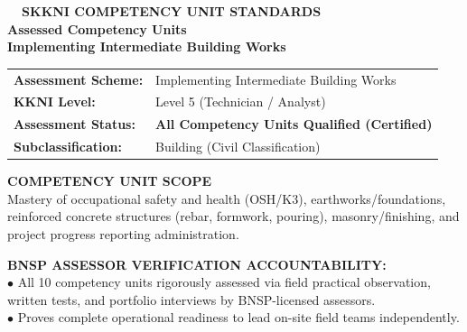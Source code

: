 \documentclass[10pt,a4paper,landscape]{article}
\begin{document}
\noindent
\begin{minipage}[t]{0.30\linewidth}
  \vspace{0pt}
  \begin{tcolorbox}[sharp corners, boxrule=0.8pt, colframe=pborder, colback=white, left=3mm, right=3mm, top=2.5mm, bottom=2.5mm, height=100mm]
    \colorbox{pred}{\fontsize{7pt}{8pt}\selectfont\bfseries\color{white}\ \ SKKNI COMPETENCY UNIT STANDARDS\ \ }\\[1.5mm]
    {\fontsize{9.5pt}{11.5pt}\selectfont\bfseries\color{pnavy}Assessed Competency Units}\\[0.5mm]
    {\fontsize{7pt}{8.5pt}\selectfont\bfseries\color{pred}Implementing Intermediate Building Works}\\[2mm]

    \begin{tcolorbox}[sharp corners, boxrule=0.5pt, colframe=pborder, colback=pbglight, left=2mm, right=2mm, top=1.5mm, bottom=1.5mm]
      \begin{tabularx}{\linewidth}{@{}p{22mm} X@{}}
        {\fontsize{6.8pt}{8pt}\selectfont\bfseries Assessment Scheme:} & {\fontsize{6.8pt}{8pt}\selectfont Implementing Intermediate Building Works} \\[0.8mm]
        {\fontsize{6.8pt}{8pt}\selectfont\bfseries KKNI Level:} & {\fontsize{6.8pt}{8pt}\selectfont Level 5 (Technician / Analyst)} \\[0.8mm]
        {\fontsize{6.8pt}{8pt}\selectfont\bfseries Assessment Status:} & {\fontsize{6.8pt}{8pt}\selectfont\bfseries\color{pred} All Competency Units Qualified (Certified)} \\[0.8mm]
        {\fontsize{6.8pt}{8pt}\selectfont\bfseries Subclassification:} & {\fontsize{6.8pt}{8pt}\selectfont Building (Civil Classification)}
      \end{tabularx}
    \end{tcolorbox}
    \vspace{1.5mm}

    {\fontsize{7.5pt}{9pt}\selectfont\bfseries\color{pnavy}COMPETENCY UNIT SCOPE}\\[0.8mm]
    {\fontsize{6.5pt}{8.2pt}\selectfont\color{psteel}
    Mastery of occupational safety and health (OSH/K3), earthworks/foundations, reinforced concrete structures (rebar, formwork, pouring), masonry/finishing, and project progress reporting administration.
    }
  \end{tcolorbox}
  \vspace{2mm}

  \begin{tcolorbox}[sharp corners, boxrule=0.6pt, colframe=pnavy, colback=pbglight, left=2.5mm, right=2.5mm, top=2mm, bottom=2mm, height=52mm]
    {\fontsize{7pt}{8.5pt}\selectfont\bfseries\color{pnavy}BNSP ASSESSOR VERIFICATION ACCOUNTABILITY:}\\[1.5mm]
    {\fontsize{6.5pt}{8.2pt}\selectfont\color{psteel}
    $\bullet$ All 10 competency units rigorously assessed via field practical observation, written tests, and portfolio interviews by BNSP-licensed assessors.\\
    $\bullet$ Proves complete operational readiness to lead on-site field teams independently.
    }
  \end{tcolorbox}
\end{minipage}%
\end{document}
